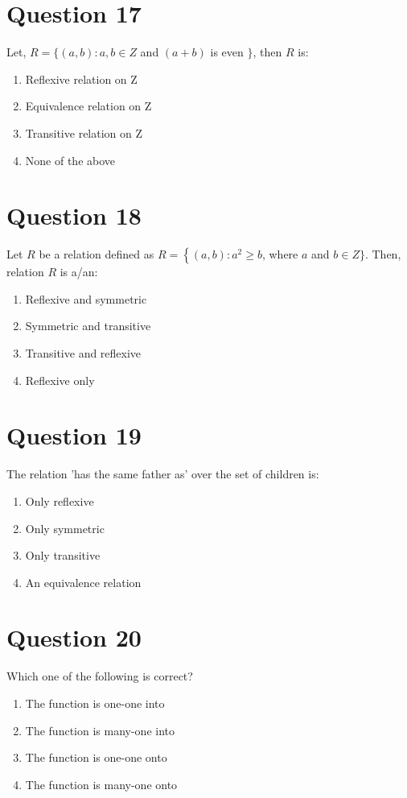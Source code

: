 \documentclass{article}
\begin{document}
\section*{Question 17}
Let, \(R=\{(a, b): a, b \in Z\) and \((a+b)\) is even \(\}\), then \(R\) is:
\begin{enumerate}[label=(\alph*)]
\item Reflexive relation on Z
\item Equivalence relation on Z
\item Transitive relation on Z
\item None of the above
\end{enumerate}
\newpage
\section*{Question 18}
Let \(R\) be a relation defined as \(R=\left\{(a, b): a^{2} \geq b\right.\), where \(a\) and \(b \in Z\}\). Then, relation \(R\) is a/an:\newline
\begin{enumerate}[label=(\alph*)]
\item Reflexive and symmetric
\item Symmetric and transitive
\item Transitive and reflexive
\item Reflexive only
\end{enumerate}
\newpage
\section*{Question 19}
The relation 'has the same father as' over the set of children is:
\begin{enumerate}[label=(\alph*)]
\item Only reflexive
\item Only symmetric
\item Only transitive
\item An equivalence relation
\end{enumerate}
\newpage
\section*{Question 20}
Which one of the following is correct?
\begin{enumerate}[label=(\alph*)]
\item The function is one-one into
\item The function is many-one into
\item The function is one-one onto
\item The function is many-one onto
\end{enumerate}
\newpage
\end{document}
